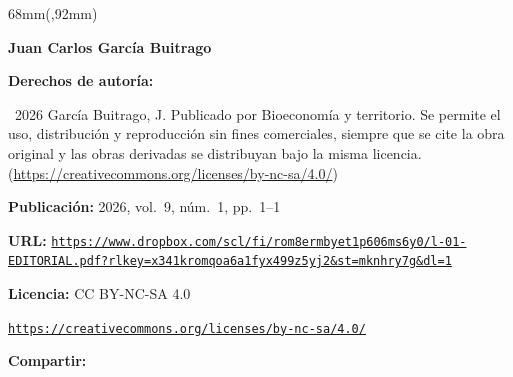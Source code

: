 \documentclass{article}
\newlength{\gbbloquex}
\begin{document}
\begin{textblock*}{68mm}(\gbbloquex,92mm)
{\setlength{\leftskip}{0pt}\setlength{\parindent}{0pt}%
\noindent\begin{minipage}[t]{68mm}
\sffamily\small\setlength{\parskip}{1pt}
{\bfseries\color{azulrevista}Juan Carlos García Buitrago}\par
\vspace{6pt}
{\bfseries\color{azulrevista!70}Derechos de autor\'ia:}\par
\textcopyright\ 2026 García Buitrago, J. Publicado por Bioeconomía y territorio. Se permite el uso, distribución y reproducción sin fines comerciales, siempre que se cite la obra original y las obras derivadas se distribuyan bajo la misma licencia. (\href{https://creativecommons.org/licenses/by-nc-sa/4.0/}{https://creativecommons.org/licenses/by-nc-sa/4.0/})\par\vspace{6pt}
{\bfseries\color{azulrevista!70}Publicación:} 2026, vol.~9, n\'um.~1, pp.~1--1\par\vspace{6pt}
{\bfseries\color{azulrevista!70}URL:} {\scriptsize\texttt{\href{https://www.dropbox.com/scl/fi/rom8ermbyet1p606ms6y0/l-01-EDITORIAL.pdf?rlkey=x341kromqoa6a1fyx499z5yj2&st=mknhry7g&dl=1}{https://www.dropbox.com/scl/fi/rom8ermbyet1p606ms6y0/l-01-EDITORIAL.pdf?rlkey=x341kromqoa6a1fyx499z5yj2&st=mknhry7g&dl=1}}}\par\vspace{6pt}
{\bfseries\color{azulrevista!70}Licencia:} CC BY-NC-SA 4.0\par
{\scriptsize\texttt{\href{https://creativecommons.org/licenses/by-nc-sa/4.0/}{https://creativecommons.org/licenses/by-nc-sa/4.0/}}}\par
\vspace{6pt}
\vspace{6pt}
{\bfseries\color{azulrevista!70}Compartir:}\par\vspace{3pt}
{\large
\href{https://bsky.app/intent/compose?text=https%3A%2F%2Fwww.dropbox.com%2Fscl%2Ffi%2From8ermbyet1p606ms6y0%2Fl-01-EDITORIAL.pdf%3Frlkey%3Dx341kromqoa6a1fyx499z5yj2%26st%3Dmknhry7g%26dl%3D1}{}~
\href{mailto:?subject=Editorial&body=https%3A%2F%2Fwww.dropbox.com%2Fscl%2Ffi%2From8ermbyet1p606ms6y0%2Fl-01-EDITORIAL.pdf%3Frlkey%3Dx341kromqoa6a1fyx499z5yj2%26st%3Dmknhry7g%26dl%3D1}{}~
}
\end{minipage}}
\end{textblock*}
\end{document}

